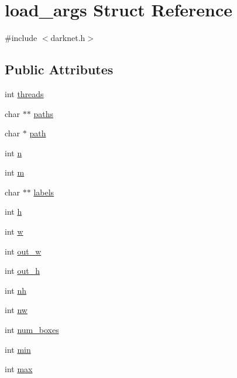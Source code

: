 \hypertarget{structload__args}{}\section{load\+\_\+args Struct Reference}
\label{structload__args}


{\ttfamily \#include $<$darknet.\+h$>$}

\subsection*{Public Attributes}
\begin{DoxyCompactItemize}
\item 
int \mbox{\hyperlink{structload__args_a3f6b3f3ef9406ab124550bc8166f2dcd}{threads}}
\item 
char $\ast$$\ast$ \mbox{\hyperlink{structload__args_aadcafc7eb67b2a86a1a7a6ff2ab80a94}{paths}}
\item 
char $\ast$ \mbox{\hyperlink{structload__args_a2fe0df26f167df4807c7fb67bf835813}{path}}
\item 
int \mbox{\hyperlink{structload__args_a46de5db87a3c8c05130d5b23a2cdea2f}{n}}
\item 
int \mbox{\hyperlink{structload__args_aca89fa6ea8f11383062a905539477001}{m}}
\item 
char $\ast$$\ast$ \mbox{\hyperlink{structload__args_a66b04c5770c0b451fa14a4a87258be9d}{labels}}
\item 
int \mbox{\hyperlink{structload__args_a9cc50b164512ec4db097288e9d569729}{h}}
\item 
int \mbox{\hyperlink{structload__args_a936232a911399499924e00ba80ad16bf}{w}}
\item 
int \mbox{\hyperlink{structload__args_aac906990c64be46d44ca7c9895eca6ec}{out\+\_\+w}}
\item 
int \mbox{\hyperlink{structload__args_aebbded43f56f35f190cd93501cfb8fa3}{out\+\_\+h}}
\item 
int \mbox{\hyperlink{structload__args_a2a9063dbc5416dc01971bec6a3179a80}{nh}}
\item 
int \mbox{\hyperlink{structload__args_a46bfaa805648b12918b2fff4c66940c7}{nw}}
\item 
int \mbox{\hyperlink{structload__args_ac8bdb2525a537b886829037122651101}{num\+\_\+boxes}}
\item 
int \mbox{\hyperlink{structload__args_a1dceb8bb209570cf9dd9fd5de36f206d}{min}}
\item 
int \mbox{\hyperlink{structload__args_a7f5319b3ca7889ed85ac8cc60de8a40d}{max}}

\end{DoxyCompactItemize}
